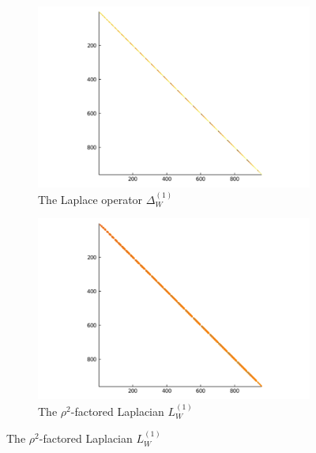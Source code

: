 \documentclass[11pt, oneside]{article}   	%
\begin{document}
\begin{figure}[t]
	\centering %
	\begin{subfigure}{0.45\textwidth}
		\includegraphics[scale=0.3]{sparsity-of-laplacian}
		\centering
		\caption{The Laplace operator $\Delta^{(1)}_W$}
	\end{subfigure}\hfil %
	\begin{subfigure}{0.45\textwidth}
		\includegraphics[scale=0.3]{sparsity-of-rho2laplacian}
		\centering
		\caption{The $\rho^2$-factored Laplacian $L_W^{(1)}$}
	\end{subfigure}\hfil %


\end{figure}
\end{document}

